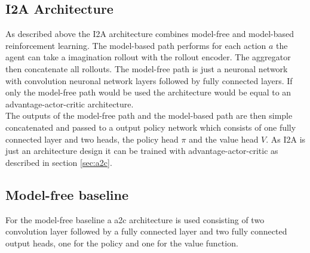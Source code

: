  
   
 
\subsection{I2A Architecture}


As described above the I2A architecture combines model-free and model-based reinforcement learning.
The model-based path performs for each action $a$ the agent can take a imagination rollout with the rollout encoder.
The aggregator then concatenate all rollouts.
The model-free path is just a neuronal network with convolution neuronal network layers followed by fully connected layers.
If only the model-free path would be used the architecture would be equal to an advantage-actor-critic architecture.\\
 

The outputs of the model-free path and the model-based path are then simple concatenated and passed to a output policy network which consists of one fully connected layer and two heads, the policy head $\pi$ and the value head $V$.
As I2A is just an architecture design it can be trained with advantage-actor-critic as described in section \ref{sec:a2c}.\\

 
 


 

 
\subsection{Model-free baseline}

For the model-free baseline a a2c architecture is used consisting of two convolution layer followed by a fully connected layer and two fully connected output heads, one for the policy and one for the value function.\\

